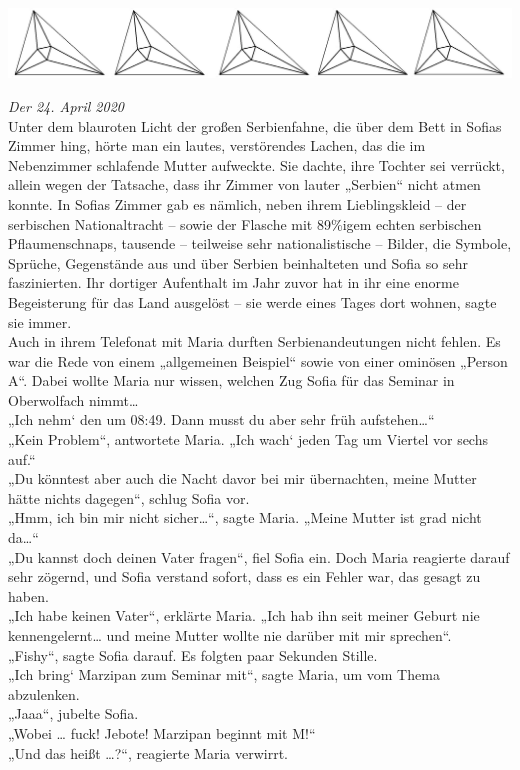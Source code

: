 \documentclass[oneside]{memoir}
\newcommand{\parasep}{
\bigskip
\bigskip
\begin{center} 
   \includegraphics[scale=.08]{parasep5.jpg} 
\end{center}
\bigskip
\bigskip
}
\begin{document}
\parasep

\textit{Der 24. April 2020} \\ 
Unter dem blauroten Licht der großen Serbienfahne, die über dem Bett in Sofias Zimmer hing, hörte man ein lautes, verstörendes Lachen, das die im Nebenzimmer schlafende Mutter aufweckte. Sie dachte, ihre Tochter sei verrückt, allein wegen der Tatsache, dass ihr Zimmer von lauter „Serbien“ nicht atmen konnte. In Sofias Zimmer gab es nämlich, neben ihrem Lieblingskleid -- der serbischen Nationaltracht -- sowie der Flasche mit 89\%igem echten serbischen Pflaumenschnaps, tausende -- teilweise sehr nationalistische -- Bilder, die Symbole, Sprüche, Gegenstände aus und über Serbien beinhalteten und Sofia so sehr faszinierten. Ihr dortiger Aufenthalt im Jahr zuvor hat in ihr eine enorme Begeisterung für das Land ausgelöst -- sie werde eines Tages dort wohnen, sagte sie immer. \\
Auch in ihrem Telefonat mit Maria durften Serbienandeutungen nicht fehlen. Es war die Rede von einem „allgemeinen Beispiel“ sowie von einer ominösen „Person A“. Dabei wollte Maria nur wissen, welchen Zug Sofia für das Seminar in Oberwolfach nimmt\ldots \\ 
„Ich nehm‘ den um 08:49. Dann musst du aber sehr früh aufstehen\ldots“  \\ 
„Kein Problem“, antwortete Maria. „Ich wach‘ jeden Tag um Viertel vor sechs auf.“ \\  
„Du könntest aber auch die Nacht davor bei mir übernachten, meine Mutter hätte nichts dagegen“, schlug Sofia vor.  \\ 
„Hmm, ich bin mir nicht sicher\ldots“, sagte Maria. „Meine Mutter ist grad nicht da\ldots“  \\ 
„Du kannst doch deinen Vater fragen“, fiel Sofia ein. 
Doch Maria reagierte darauf sehr zögernd, und Sofia verstand sofort, dass es ein Fehler war, das gesagt zu haben. \\ 
„Ich habe keinen Vater“, erklärte Maria. „Ich hab ihn seit meiner Geburt nie kennengelernt\ldots{} und meine Mutter wollte nie darüber mit mir sprechen“. \\
„Fishy“, sagte Sofia darauf. 
Es folgten paar Sekunden Stille. 
 \\ 
„Ich bring‘ Marzipan zum Seminar mit“,  sagte Maria, um vom Thema abzulenken. \\
„Jaaa“, jubelte Sofia.  \\ 
„Wobei \ldots{} fuck! Jebote! Marzipan beginnt mit M!“  \\ 
„Und das heißt \ldots?“, reagierte Maria verwirrt.  \\ 
\end{document}
